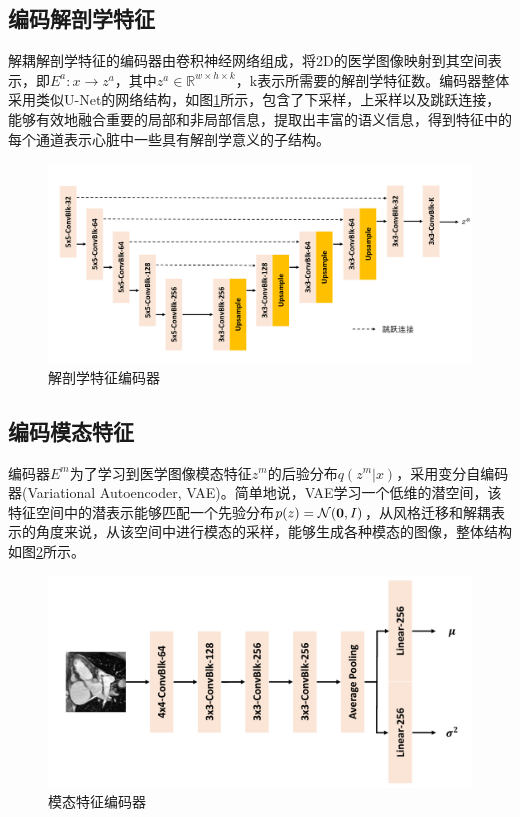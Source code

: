 \subsection{编码解剖学特征}
解耦解剖学特征的编码器由卷积神经网络组成，将2D的医学图像映射到其空间表示，即$E^a:x\rightarrow z^a$，其中$z^a\in \mathbb{R}^{w\times h\times k}$，k表示所需要的解剖学特征数。编码器整体采用类似U-Net\cite{ronneberger2015u}的网络结构，如图\ref{fig:enc_anatomy}所示，包含了下采样，上采样以及跳跃连接，能够有效地融合重要的局部和非局部信息，提取出丰富的语义信息，得到特征中的每个通道表示心脏中一些具有解剖学意义的子结构。
\begin{figure}
    \centering
    \includegraphics[width=\textwidth]{image/chap03/encoder_anatomy.pdf}
    \caption{解剖学特征编码器}
    \label{fig:enc_anatomy}
\end{figure}
\subsection{编码模态特征}
编码器$E^m$为了学习到医学图像模态特征$z^m$的后验分布$q(z^m|x)$，采用变分自编码器\cite{kingma2013auto}(Variational Autoencoder, VAE)。简单地说，VAE学习一个低维的潜空间，该特征空间中的潜表示能够匹配一个先验分布$p(z)=\mathcal{N}(\bold{0},I)$，从风格迁移和解耦表示的角度来说，从该空间中进行模态的采样，能够生成各种模态的图像，整体结构如图\ref{fig:enc_modality}所示。
\begin{figure}
    \centering
    \includegraphics[width=\textwidth]{image/chap03/encoder_modality.pdf}
    \caption{模态特征编码器}
    \label{fig:enc_modality}
\end{figure}

